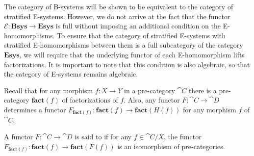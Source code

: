 The category of B-systems will be shown to be equivalent to the category of
stratified E-systems. However, we do not arrive at the fact that the functor
$\mathcal{E}:\mathbf{Bsys}\to\mathbf{Esys}$ is full without imposing an additional
condition on the E-homomorphisms. 
To ensure that the category of stratified E-systems with stratified 
E-homomorphisms between them is a full subcategory of the category 
$\mathbf{Esys}$, we will require that the underlying functor of each E-homomorphism
lifts factorizations. It is
important to note that this condition is also algebraic, so that the category
of E-systems remains algebraic.

Recall that for any morphism $f:X\to Y$ in a pre-category $\cat{C}$ there is a pre-category
$\mathbf{fact}(f)$ of factorizations of $f$. Also, any functor $F:\cat{C}\to\cat{D}$
determines a functor $F_{\mathbf{fact}(f)}:\mathbf{fact}(f)\to\mathbf{fact}(H(f))$
for any morphism $f$ of $\cat{C}$.

\begin{defn}\label{defn:lift_factorizations}
A functor $F:\cat{C}\to\cat{D}$ is said to
 if for any $f\in\cat{C}/X$, the functor
$F_{\mathbf{fact}(f)}:\mathbf{fact}(f)\to\mathbf{fact}(F(f))$ is an isomorphism
of pre-categories. 
\end{defn}

\begin{comment}
\begin{rmk}
We may choose the property of lifting factorizations
to involve either an equivalence or an isomorphism of categories. The
isomorphism-version, would say that for every factorization $h'\circ g'$
of $F(f)$ there is a unique factorization $f\jdeq h\circ g$ in $\cat{C}$ such
that $F(g)\jdeq g'$ and $F(h)\jdeq h'$. In the version with equivalences,
the uniqueness is replaced by uniqueness up to isomorphism, and the equalities
are replaced by an isomorphism in $\mathbf{fact}(F(f))$. 

It is easier to state the isomorphism version of lifting factorizations with
inference rules and it might be easier to explain this condition on type theoretical
grounds, although the equivalence version has the advantage of being
categorical (i.e.~invariant under equivalence of categories).

In the present
context, it doesn't matter very much which one we pick: the categories in which
we're interested are all posets.
\end{rmk}
\end{comment}

